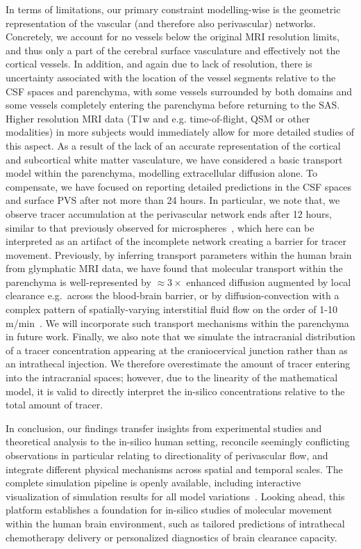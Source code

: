 \documentclass[fleqn,10pt]{wlscirep}
\begin{document}
In terms of limitations, our primary constraint modelling-wise is the
geometric representation of the vascular (and therefore also
perivascular) networks. Concretely, we account for no vessels below
the original MRI resolution limits, and thus only a part of the
cerebral surface vasculature and effectively not the cortical
vessels. In addition, and again due to lack of resolution, there is
uncertainty associated with the location of the vessel segments
relative to the CSF spaces and parenchyma, with some vessels
surrounded by both domains and some vessels completely entering the
parenchyma before returning to the SAS. Higher resolution MRI data
(T1w and e.g. time-of-flight, QSM or other modalities) in more
subjects would immediately allow for more detailed studies of this
aspect. As a result of the lack of an accurate representation of the
cortical and subcortical white matter vasculature, we have considered
a basic transport model within the parenchyma, modelling extracellular
diffusion alone. To compensate, we have focused on reporting detailed
predictions in the CSF spaces and surface PVS after not more than 24
hours. In particular, we note that, we observe tracer accumulation at
the perivascular network ends after 12 hours, similar to that
previously observed for microspheres~\cite{bedussi2018paravascular,
  mestre2018flow}, which here can be interpreted as an artifact of the
incomplete network creating a barrier for tracer movement. Previously,
by inferring transport parameters within the human brain from
glymphatic MRI data, we have found that molecular transport within the
parenchyma is well-represented by $\approx 3\times$ enhanced diffusion
augmented by local clearance e.g.~across the blood-brain barrier, or
by diffusion-convection with a complex pattern of spatially-varying
interstitial fluid flow on the order of 1-10 \textmu
m/min~\cite{vinje2023human}. We will incorporate such transport
mechanisms within the parenchyma in future work. Finally, we also note
that we simulate the intracranial distribution of a tracer
concentration appearing at the craniocervical junction rather than as
an intrathecal injection. We therefore overestimate the amount of
tracer entering into the intracranial spaces; however, due to the
linearity of the mathematical model, it is valid to directly interpret
the in-silico concentrations relative to the total amount of tracer.

In conclusion, our findings transfer insights from experimental
studies and theoretical analysis to the in-silico human setting,
reconcile seemingly conflicting observations in particular relating to
directionality of perivascular flow, and integrate different physical
mechanisms across spatial and temporal scales. The complete
simulation pipeline is openly available, including interactive
visualization of simulation results for all model
variations~\cite{ZENODO}. Looking ahead, this platform establishes a
foundation for in-silico studies of molecular movement within the
human brain environment, such as tailored predictions of intrathecal
chemotherapy delivery or personalized diagnostics of brain clearance
capacity.
\end{document}
